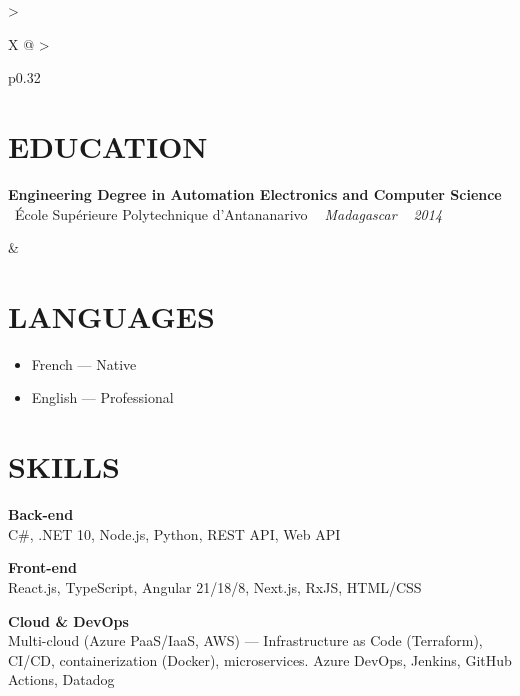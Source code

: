 \documentclass[10pt,a4paper]{article}
\begin{document}
\setlength{\tabcolsep}{0pt}
\begin{tabularx}{\textwidth}{
  >{\raggedright\arraybackslash}X
  @{\hspace{1cm}}
  >{\raggedright\arraybackslash}p{0.32\textwidth}
}
\begin{minipage}[t]{\linewidth}
\section*{EDUCATION}

\textbf{Engineering Degree in Automation Electronics and Computer Science}\\
\textcolor{primary}{ \faGraduationCap\ \'Ecole Sup\'erieure Polytechnique d'Antananarivo} \quad
\textit{ \small \textcolor{darkgray}{ \faMapMarker\ } Madagascar } \hfill  \textit{ \small \textcolor{darkgray}{ \faCalendar\ } 2014 }
\end{minipage}
&
\begin{minipage}[t]{\linewidth}

\section*{LANGUAGES}

\begin{itemize}
  \item French --- Native
  \item English --- Professional
\end{itemize}

\section*{SKILLS}

\textbf{\color{primary} Back-end}\\
\color{darkgray} C\#, .NET 10, Node.js, Python, REST API, Web API

\vspace{4pt}

\textbf{\color{primary} Front-end}\\
\color{darkgray} React.js, TypeScript, Angular 21/18/8, Next.js, RxJS, HTML/CSS

\vspace{4pt}

\textbf{\color{primary} Cloud \& DevOps}\\
\color{darkgray} Multi-cloud (Azure PaaS/IaaS, AWS) --- Infrastructure as Code (Terraform), CI/CD, containerization (Docker), microservices. Azure DevOps, Jenkins, GitHub Actions, Datadog


\end{minipage}
\end{tabularx}
\end{document}
